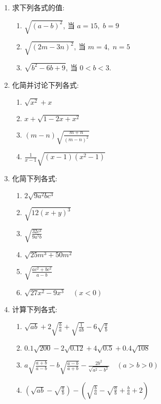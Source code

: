 \begin{enumerate}
    \item 求下列各式的值:
\begin{enumerate}
    \item $\sqrt{(a-b)^{2}}$, 当 $a=15,\; b=9$
    \item $\sqrt{(2 m-3 n)^{2}}$, 当 $m=4,\; n=5$
    \item $\sqrt{b^{2}-6 b+9}$, 当 $0<b<3$.
\end{enumerate}
\item 化简并讨论下列各式:
\begin{multicols}{2}
   \begin{enumerate}
    \item $\sqrt{x^{2}}+x$
    \item $x+\sqrt{1-2 x+x^{2}}$
    \item $(m-n) \sqrt{\frac{m+n}{(m-n)^{2}}}$
    \item $\frac{1}{x-1} \sqrt{(x-1)\left(x^{2}-1\right)}$
\end{enumerate} 
\end{multicols}


\item 化简下列各式:
\begin{multicols}{2}
    \begin{enumerate}
\item $2 \sqrt{9 a^{2} b c^{3}}$
\item $\sqrt{12(x+y)^{3}}$
\item $\sqrt{\frac{32 c^{3}}{9 a^{5} b} }$
\item $\sqrt{25 m^{3}+50 m^{2}}$
\item  $\sqrt{\frac{a c^{2}+b c^{2}}{a-b}}$
\item  $\sqrt{27 x^{2}-9 x^{3}} \quad(x<0)$
\end{enumerate}
\end{multicols}


\item 计算下列各式:
\begin{enumerate}
\item $\sqrt{a b}+2 \sqrt{\frac{b}{a}}+\sqrt{\frac{1}{a b}}-6 \sqrt{\frac{a}{b}}$
\item $0.1 \sqrt{200}-2 \sqrt{0.12}+4 \sqrt{0.5}+0.4 \sqrt{108}$
\item $a \sqrt{\frac{a+b}{a-b}}-b \sqrt{\frac{a-b}{a+b}}-\frac{2 b^{2}}{\sqrt{a^{2}-b^{2}}}\quad (a>b>0)$
\item $\left(\sqrt{a b}-\sqrt{\frac{a}{b}}\right)-\left(\sqrt{\frac{b}{a}}-\sqrt{\frac{a}{b}}+\frac{b}{a}+2\right)$
\end{enumerate}


\end{enumerate}
